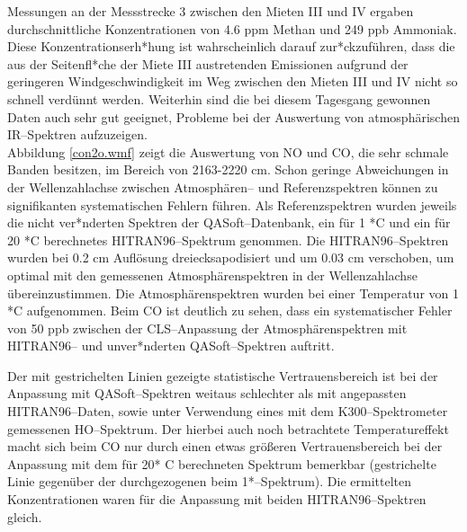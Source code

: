 Messungen an der Messstrecke 3 zwischen den Mieten III und IV
ergaben durchschnittliche Konzentrationen von 4.6 ppm Methan und
249 ppb Ammoniak. Diese Konzentrationserh*hung ist wahrscheinlich
darauf zur*ckzuführen, dass die aus der Seitenfl*che der Miete III
austretenden Emissionen aufgrund der geringeren
Windgeschwindigkeit im Weg zwischen den Mieten III und IV nicht so
schnell verdünnt werden. Weiterhin sind die bei diesem Tagesgang
gewonnen Daten auch sehr gut geeignet, Probleme bei der Auswertung
von atmosphärischen IR--Spektren aufzuzeigen.\\

Abbildung \ref{con2o.wmf} zeigt die Auswertung von NO und
CO, die sehr schmale Banden besitzen, im Bereich von 2163-2220
cm. Schon geringe Abweichungen in der Wellenzahlachse
zwischen Atmosphären-- und Referenzspektren können zu
signifikanten systematischen Fehlern führen. Als Referenzspektren
wurden jeweils die nicht ver*nderten Spektren der
QASoft--Datenbank, ein für 1 *C und ein für 20 *C berechnetes
HITRAN96--Spektrum genommen. Die HITRAN96--Spektren wurden bei 0.2
cm Auflösung dreiecksapodisiert und um 0.03 cm
verschoben, um optimal mit den gemessenen Atmosphärenspektren in
der Wellenzahlachse übereinzustimmen. Die Atmosphärenspektren
wurden bei einer Temperatur von 1 *C aufgenommen. Beim CO ist
deutlich zu sehen, dass ein systematischer Fehler von 50 ppb
zwischen der CLS--Anpassung der Atmosphärenspektren mit HITRAN96--
und unver*nderten QASoft--Spektren auftritt.\\


Der mit gestrichelten Linien gezeigte statistische
Vertrauensbereich ist bei der Anpassung mit QASoft--Spektren
weitaus schlechter als mit angepassten HITRAN96--Daten, sowie
unter Verwendung eines mit dem K300--Spektrometer gemessenen
HO--Spektrum. Der hierbei auch noch betrachtete
Temperatureffekt macht sich beim CO nur durch einen etwas größeren
Vertrauensbereich bei der Anpassung mit dem für 20* C berechneten
Spektrum bemerkbar (gestrichelte Linie gegenüber der
durchgezogenen beim 1*--Spektrum). Die ermittelten Konzentrationen
waren für die Anpassung mit beiden HITRAN96--Spektren gleich.\\

